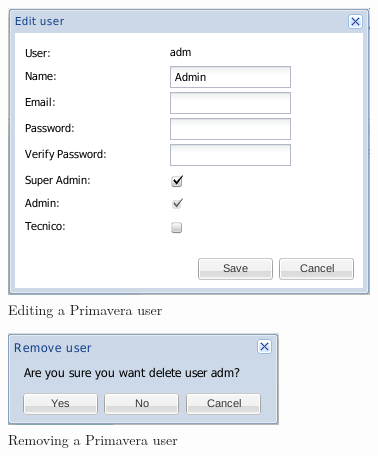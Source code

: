 \begin{figure}[H]
    \begin{center}
    \includegraphics[scale=0.6]{screenshots/primavera/primaverainterface_09.png}
    \caption{Editing a Primavera user}
    \label{fig:primavera_edit_user}
    \end{center}
\end{figure}

\begin{figure}[H]
    \begin{center}
    \includegraphics[scale=0.6]{screenshots/primavera/primaverainterface_10.png}
    \caption{Removing a Primavera user}
    \label{fig:primavera_delete_user}
    \end{center}
\end{figure}

